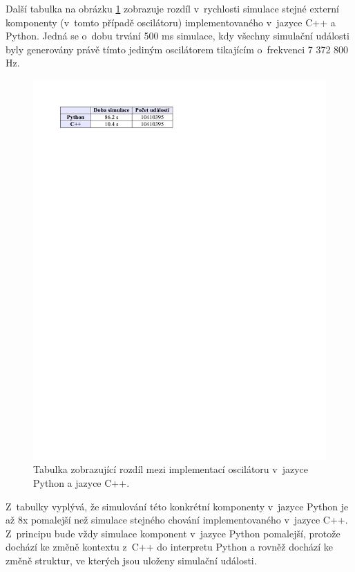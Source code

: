 Další tabulka na obrázku \ref{fig:tabulka3} zobrazuje rozdíl v~rychlosti simulace stejné externí komponenty (v~tomto případě oscilátoru) implementovaného v~jazyce C++ a Python. Jedná se o~dobu trvání 500 ms simulace, kdy všechny simulační události byly generovány právě tímto jediným oscilátorem tikajícím o~frekvenci 7 372 800 Hz.

\begin{figure}[ht]
\centering
\includegraphics[trim=-2cm 24.5cm 5cm 2cm]{fig/tabulka3}
\caption{Tabulka zobrazující rozdíl mezi implementací oscilátoru v~jazyce Python a jazyce C++.}
\label{fig:tabulka3}
\end{figure}

Z~tabulky vyplývá, že simulování této konkrétní komponenty v~jazyce Python je až 8x pomalejší než simulace stejného chování implementovaného v~jazyce C++. Z~principu bude vždy simulace komponent v~jazyce Python pomalejší, protože dochází ke změně kontextu z~C++ do interpretu Python a rovněž dochází ke změně struktur, ve kterých jsou uloženy simulační události.

